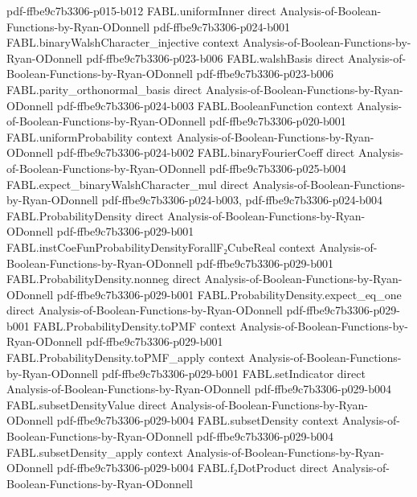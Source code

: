 \begin{theorem}
  {pdf-ffbe9c7b3306-p015-b012}
\proofstep
  {FABL.uniformInner}
  {direct}
  {Analysis-of-Boolean-Functions-by-Ryan-ODonnell}
  {pdf-ffbe9c7b3306-p024-b001}
\proofstep
  {FABL.binaryWalshCharacter_injective}
  {context}
  {Analysis-of-Boolean-Functions-by-Ryan-ODonnell}
  {pdf-ffbe9c7b3306-p023-b006}
\proofstep
  {FABL.walshBasis}
  {direct}
  {Analysis-of-Boolean-Functions-by-Ryan-ODonnell}
  {pdf-ffbe9c7b3306-p023-b006}
\proofstep
  {FABL.parity_orthonormal_basis}
  {direct}
  {Analysis-of-Boolean-Functions-by-Ryan-ODonnell}
  {pdf-ffbe9c7b3306-p024-b003}
\proofstep
  {FABL.BooleanFunction}
  {context}
  {Analysis-of-Boolean-Functions-by-Ryan-ODonnell}
  {pdf-ffbe9c7b3306-p020-b001}
\proofstep
  {FABL.uniformProbability}
  {context}
  {Analysis-of-Boolean-Functions-by-Ryan-ODonnell}
  {pdf-ffbe9c7b3306-p024-b002}
\proofstep
  {FABL.binaryFourierCoeff}
  {direct}
  {Analysis-of-Boolean-Functions-by-Ryan-ODonnell}
  {pdf-ffbe9c7b3306-p025-b004}
\proofstep
  {FABL.expect_binaryWalshCharacter_mul}
  {direct}
  {Analysis-of-Boolean-Functions-by-Ryan-ODonnell}
  {pdf-ffbe9c7b3306-p024-b003,
    pdf-ffbe9c7b3306-p024-b004}
\proofstep
  {FABL.ProbabilityDensity}
  {direct}
  {Analysis-of-Boolean-Functions-by-Ryan-ODonnell}
  {pdf-ffbe9c7b3306-p029-b001}
\proofstep
  {FABL.instCoeFunProbabilityDensityForallF₂CubeReal}
  {context}
  {Analysis-of-Boolean-Functions-by-Ryan-ODonnell}
  {pdf-ffbe9c7b3306-p029-b001}
\proofstep
  {FABL.ProbabilityDensity.nonneg}
  {direct}
  {Analysis-of-Boolean-Functions-by-Ryan-ODonnell}
  {pdf-ffbe9c7b3306-p029-b001}
\proofstep
  {FABL.ProbabilityDensity.expect_eq_one}
  {direct}
  {Analysis-of-Boolean-Functions-by-Ryan-ODonnell}
  {pdf-ffbe9c7b3306-p029-b001}
\proofstep
  {FABL.ProbabilityDensity.toPMF}
  {context}
  {Analysis-of-Boolean-Functions-by-Ryan-ODonnell}
  {pdf-ffbe9c7b3306-p029-b001}
\proofstep
  {FABL.ProbabilityDensity.toPMF_apply}
  {context}
  {Analysis-of-Boolean-Functions-by-Ryan-ODonnell}
  {pdf-ffbe9c7b3306-p029-b001}
\proofstep
  {FABL.setIndicator}
  {direct}
  {Analysis-of-Boolean-Functions-by-Ryan-ODonnell}
  {pdf-ffbe9c7b3306-p029-b004}
\proofstep
  {FABL.subsetDensityValue}
  {direct}
  {Analysis-of-Boolean-Functions-by-Ryan-ODonnell}
  {pdf-ffbe9c7b3306-p029-b004}
\proofstep
  {FABL.subsetDensity}
  {context}
  {Analysis-of-Boolean-Functions-by-Ryan-ODonnell}
  {pdf-ffbe9c7b3306-p029-b004}
\proofstep
  {FABL.subsetDensity_apply}
  {context}
  {Analysis-of-Boolean-Functions-by-Ryan-ODonnell}
  {pdf-ffbe9c7b3306-p029-b004}
\proofstep
  {FABL.f₂DotProduct}
  {direct}
  {Analysis-of-Boolean-Functions-by-Ryan-ODonnell}

\end{theorem}
